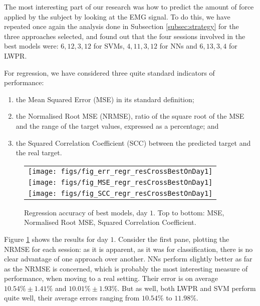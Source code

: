 The most interesting part of our research was how to predict the
amount of force applied by the subject by looking at the EMG
signal. To do this, we have repeated once again the analysis done in
Subsection \ref{subsec:strategy} for the three approaches selected,
and found out that the four sessions involved in the best models were:
$6,12,3,12$ for SVMs, $4,11,3,12$ for NNs and $6,13,3,4$ for LWPR.

For regression, we have considered three quite standard indicators of
performance:

\begin{enumerate}

  \item the Mean Squared Error (MSE) in its standard definition;

  \item the Normalised Root MSE (NRMSE), ratio of the square root of
    the MSE and the range of the target values, expressed as a
    percentage; and

  \item the Squared Correlation Coefficient (SCC) between the
    predicted target and the real target.

\end{enumerate}

\begin{figure}\centering
  \begin{tabular}{c}
    \texttt{[image: figs/fig\_err\_regr\_resCrossBestOnDay1]}\\
    \texttt{[image: figs/fig\_MSE\_regr\_resCrossBestOnDay1]} \\
    \texttt{[image: figs/fig\_SCC\_regr\_resCrossBestOnDay1]} \\
  \end{tabular}
  \caption{Regression accuracy of best models, day $1$. Top to bottom:
    MSE, Normalised Root MSE, Squared Correlation Coefficient.}
  \label{fig:best_regr}
\end{figure}

Figure \ref{fig:best_regr} shows the results for day $1$. Consider the
first pane, plotting the NRMSE for each session: as it is apparent, as
it was for classification, there is no clear advantage of one approach
over another. NNs perform slightly better as far as the NRMSE is
concerned, which is probably the most interesting measure of
performance, when moving to a real setting. Their error is on average
$10.54\% \pm 1.41\%$ and $10.01\% \pm 1.93\%$. But as well, both LWPR
and SVM perform quite well, their average errors ranging from
$10.54\%$ to $11.98\%$.

